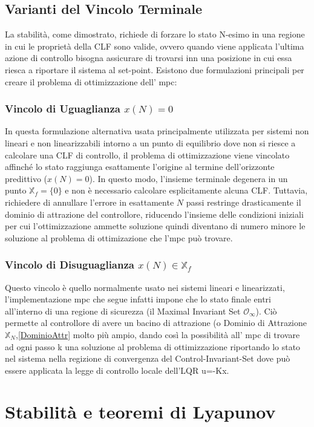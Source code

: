 \subsection{Varianti del Vincolo Terminale}
La stabilità, come dimostrato, richiede di forzare lo stato N-esimo in una regione in cui le proprietà della CLF sono valide, ovvero quando viene applicata l'ultima azione di controllo bisogna assicurare di trovarsi inn una posizione in cui essa riesca a riportare il sistema al set-point. Esistono due formulazioni principali per creare il problema di ottimizzazione dell' mpc:

\subsubsection{Vincolo di Uguaglianza $x(N) = 0$}
In questa formulazione alternativa usata principalmente utilizzata per sistemi non lineari e non linearizzabili intorno a un punto di equilibrio dove non si riesce a calcolare una CLF di controllo, il problema di ottimizzazione viene vincolato affinché lo stato raggiunga esattamente l'origine al termine dell'orizzonte predittivo ($x(N)=0$). In questo modo, l'insieme terminale degenera in un punto $\mathbb{X}_f = \{0\}$ e non è necessario calcolare esplicitamente alcuna CLF. Tuttavia, richiedere di annullare l'errore in esattamente $N$ passi restringe drasticamente il dominio di attrazione del controllore, riducendo l'insieme delle condizioni iniziali per cui l'ottimizzazione ammette soluzione quindi diventano di numero minore le soluzione al problema di ottimizazione che l'mpc può trovare.

\subsubsection{Vincolo di Disuguaglianza $x(N) \in \mathbb{X}_f$}
Questo vincolo è quello normalmente usato nei sistemi lineari e linearizzati, l'implementazione mpc che segue infatti impone che lo stato finale entri all'interno di una regione di sicurezza (il Maximal Invariant Set $\mathcal{O}_\infty$). Ciò permette al controllore di avere un bacino di attrazione (o Dominio di Attrazione $\mathbb{X}_N$,\ref{DominioAttr} molto più ampio, dando così la possibilità all' mpc di trovare ad ogni passo k una soluzione al problema di ottimizzazione riportando lo stato nel sistema nella regizione di convergenza del Control-Invariant-Set dove può essere applicata la legge di controllo locale dell'LQR u=-Kx.

\section{Stabilità e teoremi di Lyapunov}

